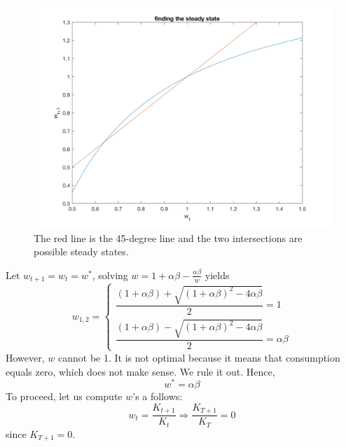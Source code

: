 \documentclass[twoside]{article}
\begin{document}
\begin{example}
\begin{figure}[htbp] 
    \centering
    \includegraphics[width=.5\textwidth]{figure/wt.png}
    \caption{The red line is the 45-degree line and the two intersections are possible steady states.}
\end{figure}

Let $w_{t+1} = w_t = w^*$, solving $w = 1+ \alpha \beta -  \frac{\alpha \beta}{w}$ yields
\begin{equation}
  w_{1,2} = \begin{cases}
    \dfrac{(1+ \alpha \beta) + \sqrt{(1+ \alpha \beta)^2-4 \alpha \beta}}{2} = 1 \\
    \dfrac{(1+ \alpha \beta) - \sqrt{(1+ \alpha \beta)^2-4 \alpha \beta}}{2} = \alpha \beta
  \end{cases}
  \end{equation}
However, $w$ cannot be 1. It is not optimal because it means that consumption equals zero, which does not make sense. We rule it out. Hence, 
\begin{equation}
  w^* = \alpha \beta
\end{equation}
To proceed, let us compute $w$'s a follows:
\begin{equation}
  w_t = \frac{K_{t+1}}{K_t} \Longrightarrow \frac{K_{T+1}}{K_T} = 0
\end{equation}
since $K_{T+1} = 0$.


\end{example}
\end{document}
